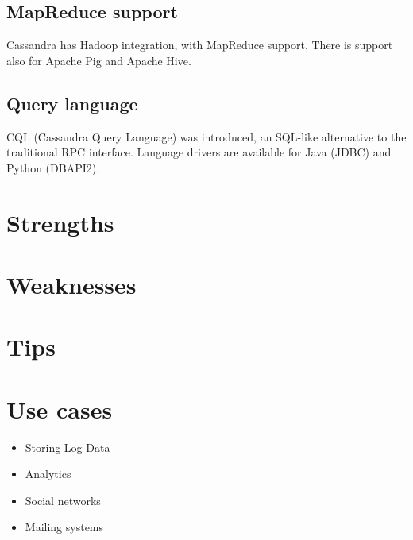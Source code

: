 \subsection{MapReduce support}
Cassandra has Hadoop integration, with MapReduce support. There is support also for Apache Pig and Apache Hive.

\subsection{Query language}

CQL (Cassandra Query Language) was introduced, an SQL-like alternative to the traditional RPC interface. Language drivers are available for Java (JDBC) and Python (DBAPI2).

\section{Strengths}

\section{Weaknesses}

\section{Tips}

\section{Use cases}

\begin{itemize}
  \item Storing Log Data
  \item Analytics
  \item Social networks
  \item Mailing systems
\end{itemize}